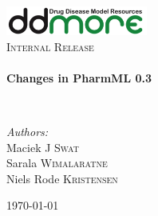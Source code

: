\begin{titlepage}
\begin{center}

\includegraphics[width=0.35\textwidth]{./logo/ddmore_logo}~\\[1cm]

%
\textsc{\Large Internal Release}\\[0.5cm]

\HRule \\[0.4cm]
{ \huge \bfseries Changes in PharmML 0.3 \\[0.4cm] }


\HRule \\[1.5cm]

\begin{minipage}{0.4\textwidth}
\begin{flushleft} \large
\emph{Authors:}\\
Maciek J \textsc{Swat}\\
Sarala \textsc{Wimalaratne}\\
Niels Rode \textsc{Kristensen}
\end{flushleft}
\end{minipage}
\begin{minipage}{0.4\textwidth}
\end{minipage}

\vfill

{\large \today}

\end{center}
\end{titlepage}